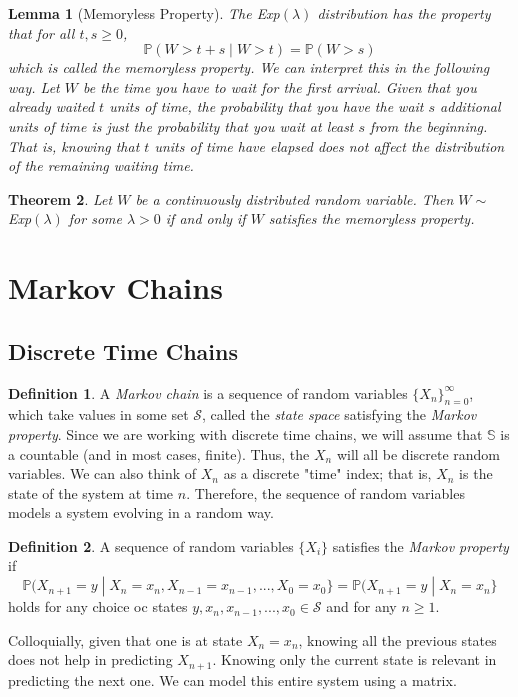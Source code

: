 \documentclass{article}
\newtheorem{theorem}{Theorem}[section]
\newtheorem{lemma}[theorem]{Lemma}
\theoremstyle{remark}
\theoremstyle{definition}
\newtheorem{definition}{Definition}[section]
\begin{document}
\begin{lemma}[Memoryless Property]
The Exp$(\lambda)$ distribution has the property that for all $t, s \geq 0$, 
\[\mathbb{P}(W > t + s \; | \; W > t) = \mathbb{P}(W > s)\]
which is called the \textit{memoryless property}. We can interpret this in the following way. Let $W$ be the time you have to wait for the first arrival. Given that you already waited $t$ units of time, the probability that you have the wait $s$ additional units of time is just the probability that you wait at least $s$ from the beginning. That is, knowing that $t$ units of time have elapsed does not affect the distribution of the remaining waiting time. 
\end{lemma}

\begin{theorem}
Let $W$ be a continuously distributed random variable. Then $W \sim$ Exp$(\lambda)$ for some $\lambda > 0$ if and only if $W$ satisfies the memoryless property. 
\end{theorem}

\section{Markov Chains}
\subsection{Discrete Time Chains}
\begin{definition}
A \textit{Markov chain} is a sequence of random variables $\{X_n\}_{n=0}^\infty$, which take values in some set $\mathcal{S}$, called the \textit{state space} satisfying the \textit{Markov property}. Since we are working with discrete time chains, we will assume that $\mathbb{S}$ is a countable (and in most cases, finite). Thus, the $X_n$ will all be discrete random variables. We can also think of $X_n$ as a discrete "time" index; that is, $X_n$ is the state of the system at time $n$. Therefore, the sequence of random variables models a system evolving in a random way. 
\end{definition}

\begin{definition}
A sequence of random variables $\{X_i\}$ satisfies the \textit{Markov property} if 
\[\mathbb{P}(X_{n+1} = y \; | \; X_n = x_n, X_{n-1} = x_{n-1}, ..., X_0 = x_0\} = \mathbb{P}(X_{n+1} = y \; | \; X_n = x_n\}\]
holds for any choice oc states $y, x_n, x_{n-1}, ..., x_0 \in \mathcal{S}$ and for any $n \geq 1$. 
\end{definition}
Colloquially, given that one is at state $X_n = x_n$, knowing all the previous states does not help in predicting $X_{n+1}$. Knowing only the current state is relevant in predicting the next one. We can model this entire system using a matrix. 
\end{document}
